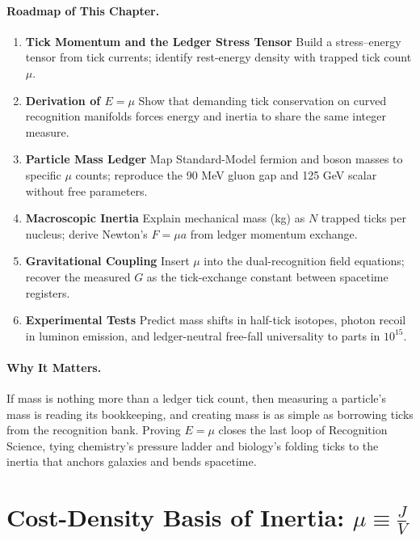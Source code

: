 \documentclass[11pt,oneside]{book}
\begin{document}
\paragraph{Roadmap of This Chapter.}
\begin{enumerate}[label=\textbf{\arabic*.}, leftmargin=1.2cm]
\item \textbf{Tick Momentum and the Ledger Stress Tensor}  
      Build a stress–energy tensor from tick currents; identify
      rest-energy density with trapped tick count \(\mu\). 
\item \textbf{Derivation of \(E=\mu\)}  
      Show that demanding tick conservation on curved
      recognition manifolds forces energy and inertia to share the same
      integer measure. 
\item \textbf{Particle Mass Ledger}  
      Map Standard-Model fermion and boson masses to specific
      \(\mu\) counts; reproduce the 90 MeV gluon gap and
      125 GeV scalar without free parameters. 
\item \textbf{Macroscopic Inertia}  
      Explain mechanical mass (kg) as $N$ trapped ticks per nucleus;
      derive Newton’s \(F = \mu a\) from ledger momentum exchange. 
\item \textbf{Gravitational Coupling}  
      Insert \(\mu\) into the dual-recognition field equations; recover
      the measured \(G\) as the tick-exchange constant between
      spacetime registers. 
\item \textbf{Experimental Tests}  
      Predict mass shifts in half-tick isotopes, photon recoil in
      luminon emission, and ledger-neutral free-fall universality to
      parts in \(10^{15}\). 
\end{enumerate}

\paragraph{Why It Matters.}
If mass is nothing more than a ledger tick count, then measuring a
particle’s mass is reading its bookkeeping, and creating mass is as
simple as borrowing ticks from the recognition bank.
Proving \(E=\mu\) closes the last loop of Recognition Science,
tying chemistry’s pressure ladder and biology’s folding ticks
to the inertia that anchors galaxies and bends spacetime.

\bigskip

\section{Cost-Density Basis of Inertia: \texorpdfstring{$\displaystyle\mu \equiv \frac{J}{V}$}{μ ≡ J ⁄ V}}
\label{sec:cost-density}
\end{document}

